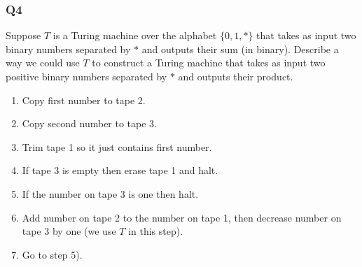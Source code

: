 \documentclass[handout]{beamer}
\begin{document}
\begin{frame}
\frametitle{Q4}
Suppose $T$ is a Turing machine over the alphabet $\{0,1,*\}$ that takes as input two binary numbers separated by $*$ and outputs their sum (in binary). Describe a way we could use $T$ to construct a Turing machine that takes as input two positive binary numbers separated by $*$ and outputs their product.
\begin{enumerate}
\item Copy first number to tape 2.
\item Copy second number to tape 3. 
\item Trim tape 1 so it just contains first number.
\item If tape 3 is empty then erase tape 1 and halt.
\item If the number on tape 3 is one then halt.
\item Add number on tape 2 to the number on tape 1, then decrease number on tape 3 by one (we use $T$ in this step).
\item Go to step 5).
\end{enumerate}
\end{frame}
\end{document}
